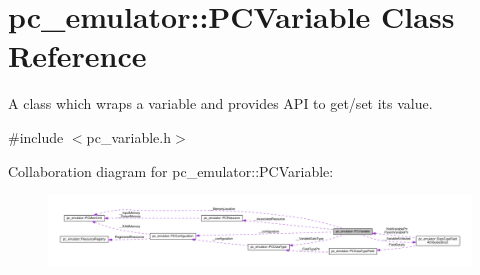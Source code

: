 \hypertarget{classpc__emulator_1_1PCVariable}{}\section{pc\+\_\+emulator\+:\+:P\+C\+Variable Class Reference}
\label{classpc__emulator_1_1PCVariable}


A class which wraps a variable and provides A\+PI to get/set its value.  




{\ttfamily \#include $<$pc\+\_\+variable.\+h$>$}



Collaboration diagram for pc\+\_\+emulator\+:\+:P\+C\+Variable\+:\nopagebreak
\begin{figure}[H]
\begin{center}
\leavevmode
\includegraphics[width=350pt]{classpc__emulator_1_1PCVariable__coll__graph}
\end{center}
\end{figure}
